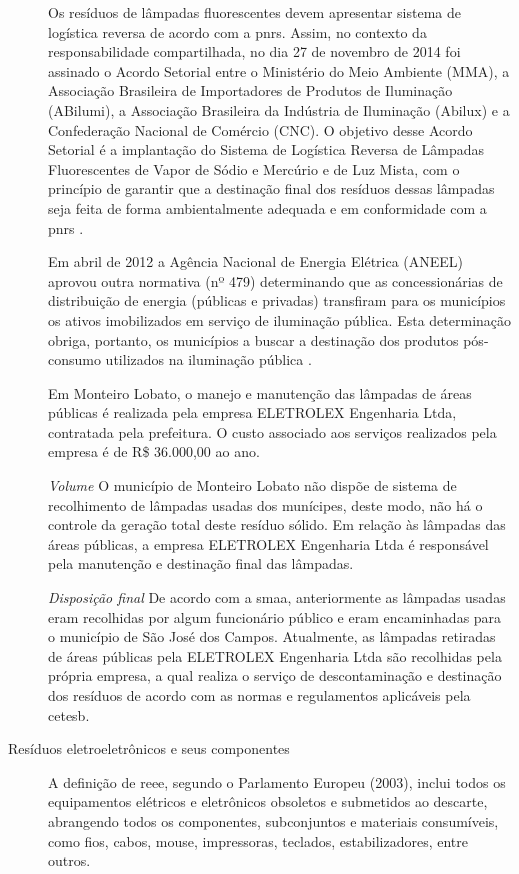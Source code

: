 \begin{description}
	Os resíduos de lâmpadas fluorescentes devem apresentar sistema de logística reversa de acordo com a \gls{pnrs}. Assim, no contexto da responsabilidade compartilhada, no dia 27 de novembro de 2014 foi assinado o Acordo Setorial entre o Ministério do Meio Ambiente (MMA), a Associação Brasileira de Importadores de Produtos de Iluminação (ABilumi), a Associação Brasileira da Indústria de Iluminação (Abilux) e a Confederação Nacional de Comércio (CNC). O objetivo desse Acordo Setorial é a implantação do Sistema de Logística Reversa de Lâmpadas Fluorescentes de Vapor de Sódio e Mercúrio e de Luz Mista, com o princípio de garantir que a destinação final dos resíduos dessas lâmpadas seja feita de forma ambientalmente adequada e em conformidade com a \gls{pnrs} \cite{Acordo2014}.
	
	Em abril de 2012 a Agência Nacional de Energia Elétrica (ANEEL) aprovou outra normativa (nº 479) determinando que as concessionárias de distribuição de energia (públicas e privadas) transfiram para os municípios os ativos imobilizados em serviço de iluminação pública. Esta determinação obriga, portanto, os municípios a buscar a destinação dos produtos pós-consumo utilizados na iluminação pública \cite{ANEEL2012}.

	Em Monteiro Lobato, o manejo e manutenção das lâmpadas de áreas públicas é realizada pela empresa ELETROLEX Engenharia Ltda, contratada pela prefeitura. O custo associado aos serviços realizados pela empresa é de R\$ 36.000,00 ao ano.
	
		\subitem \textit{Volume}
		O município de Monteiro Lobato não dispõe de sistema de recolhimento de lâmpadas usadas dos munícipes, deste modo, não há o controle da geração total deste resíduo sólido.
		Em relação às lâmpadas das áreas públicas, a empresa ELETROLEX Engenharia Ltda é responsável pela manutenção e destinação final das lâmpadas.
	
		\subitem \textit{Disposição final}
		De acordo com a \gls{smaa}, anteriormente as lâmpadas usadas eram recolhidas por algum funcionário público e eram encaminhadas para o município de São José dos Campos.
		Atualmente, as lâmpadas retiradas de áreas públicas pela ELETROLEX Engenharia Ltda são recolhidas pela própria empresa, a qual realiza o serviço de descontaminação e destinação dos resíduos de acordo com as normas e regulamentos aplicáveis pela \gls{cetesb}.
	
	
	\item[Resíduos eletroeletrônicos e seus componentes] A definição de \gls{reee}, segundo o Parlamento Europeu (2003), inclui todos os equipamentos elétricos e eletrônicos obsoletos e submetidos ao descarte, abrangendo todos os componentes, subconjuntos e materiais consumíveis, como fios, cabos, mouse, impressoras, teclados, estabilizadores, entre outros.
	

\end{description}
